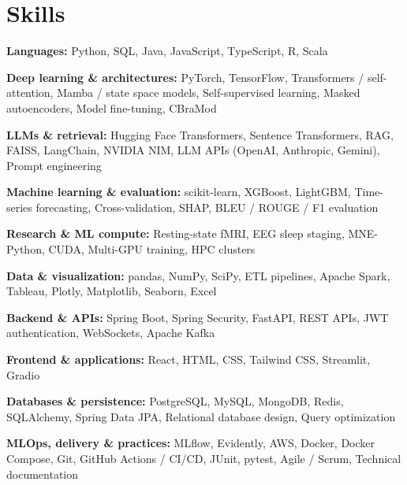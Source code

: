\documentclass[11pt,letterpaper]{article}
\begin{document}
\section*{Skills}
\textbf{Languages:} Python, SQL, Java, JavaScript, TypeScript, R, Scala\par
\textbf{Deep learning \& architectures:} PyTorch, TensorFlow, Transformers / self-attention, Mamba / state space models, Self-supervised learning, Masked autoencoders, Model fine-tuning, CBraMod\par
\textbf{LLMs \& retrieval:} Hugging Face Transformers, Sentence Transformers, RAG, FAISS, LangChain, NVIDIA NIM, LLM APIs (OpenAI, Anthropic, Gemini), Prompt engineering\par
\textbf{Machine learning \& evaluation:} scikit-learn, XGBoost, LightGBM, Time-series forecasting, Cross-validation, SHAP, BLEU / ROUGE / F1 evaluation\par
\textbf{Research \& ML compute:} Resting-state fMRI, EEG sleep staging, MNE-Python, CUDA, Multi-GPU training, HPC clusters\par
\textbf{Data \& visualization:} pandas, NumPy, SciPy, ETL pipelines, Apache Spark, Tableau, Plotly, Matplotlib, Seaborn, Excel\par
\textbf{Backend \& APIs:} Spring Boot, Spring Security, FastAPI, REST APIs, JWT authentication, WebSockets, Apache Kafka\par
\textbf{Frontend \& applications:} React, HTML, CSS, Tailwind CSS, Streamlit, Gradio\par
\textbf{Databases \& persistence:} PostgreSQL, MySQL, MongoDB, Redis, SQLAlchemy, Spring Data JPA, Relational database design, Query optimization\par
\textbf{MLOps, delivery \& practices:} MLflow, Evidently, AWS, Docker, Docker Compose, Git, GitHub Actions / CI/CD, JUnit, pytest, Agile / Scrum, Technical documentation\par
\end{document}
